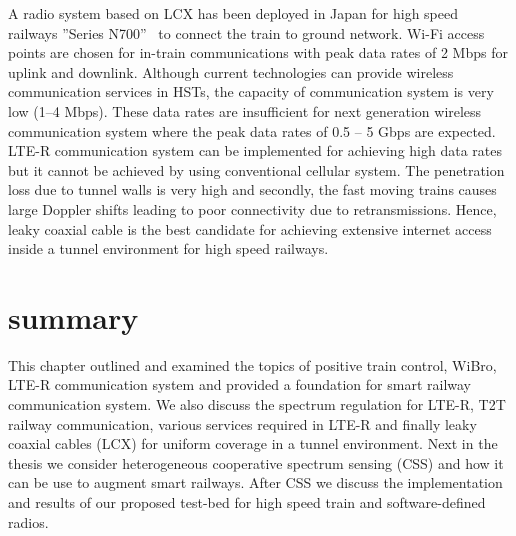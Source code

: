 A radio system based on LCX has been deployed in Japan for high speed railways ''Series N700''~\cite{takatsu2007history} to connect the train to ground network. Wi-Fi access points are chosen for in-train communications with peak data rates of 2 Mbps for uplink and downlink. Although current technologies can provide wireless communication services in HSTs, the capacity of communication system is very low (1--4 Mbps). These data rates are insufficient for next generation wireless communication system where the peak data rates of 0.5 -- 5 Gbps are expected. LTE-R communication system can be implemented for achieving high data rates but it cannot be achieved by using conventional cellular system. The penetration loss due to tunnel walls is very high and secondly, the fast moving trains causes large Doppler shifts leading to poor connectivity due to retransmissions. Hence, leaky coaxial cable is the best candidate for achieving extensive internet access inside a tunnel environment for high speed railways.

\section{summary}
This chapter outlined and examined the topics of positive train control, WiBro, LTE-R communication system and provided a foundation for smart railway communication system. We also discuss the spectrum regulation for LTE-R, T2T railway communication, various services required in LTE-R and finally leaky coaxial cables (LCX) for uniform coverage in a tunnel environment. Next in the thesis we consider heterogeneous cooperative spectrum sensing (CSS) and how it can be use to augment smart railways. After CSS we discuss the implementation and results of our proposed test-bed for high speed train and software-defined radios.\\